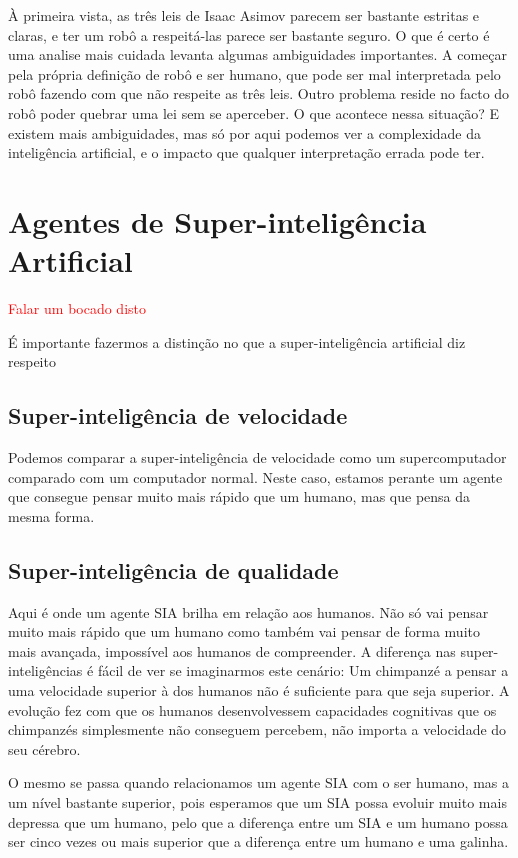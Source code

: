 \documentclass[runningheads,a4paper]{llncs}
\begin{document}
À primeira vista, as três leis de Isaac Asimov parecem ser bastante estritas e claras, e ter um robô a respeitá-las parece ser bastante seguro. O que é certo é uma analise mais cuidada levanta algumas ambiguidades importantes. A começar pela própria definição de robô e ser humano, que pode ser mal interpretada pelo robô fazendo com que não respeite as três leis. Outro problema reside no facto do robô poder quebrar uma lei sem se aperceber. O que acontece nessa situação? E existem mais ambiguidades, mas só por aqui podemos ver a complexidade da inteligência artificial, e o impacto que qualquer interpretação errada pode ter.

\section{Agentes de Super-inteligência Artificial}

\textcolor{red}{Falar um bocado disto}

É importante fazermos a distinção no que a super-inteligência artificial diz respeito


\subsection{Super-inteligência de velocidade}

Podemos comparar a super-inteligência de velocidade como um supercomputador comparado com um computador normal. Neste caso, estamos perante um agente que consegue pensar muito mais rápido que um humano, mas que pensa da mesma forma.

\subsection{Super-inteligência de qualidade}

Aqui é onde um agente SIA brilha em relação aos humanos. Não só vai pensar muito mais rápido que um humano como também vai pensar de forma muito mais avançada, impossível aos humanos de compreender. A diferença nas super-inteligências é fácil de ver se imaginarmos este cenário: Um chimpanzé a pensar a uma velocidade superior à dos humanos não é suficiente para que seja superior. A evolução fez com que os humanos desenvolvessem capacidades cognitivas que os chimpanzés simplesmente não conseguem percebem, não importa a velocidade do seu cérebro.

O mesmo se passa quando relacionamos um agente SIA com o ser humano, mas a um nível bastante superior, pois esperamos que um SIA possa evoluir muito mais depressa que um humano, pelo que a diferença entre um SIA e um humano possa ser cinco vezes ou mais superior que a diferença entre um humano e uma galinha.
\end{document}
